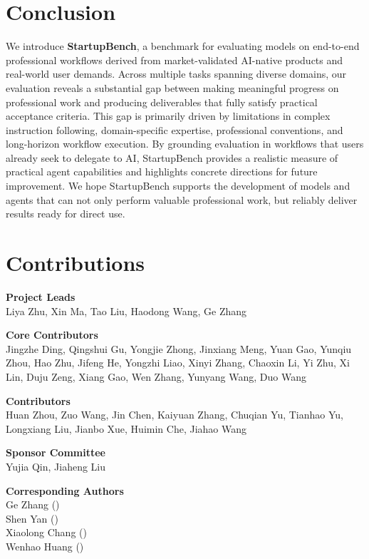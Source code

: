 \section{Conclusion}

We introduce \textbf{StartupBench}, a benchmark for evaluating models on end-to-end professional workflows derived from market-validated AI-native products and real-world user demands. Across multiple tasks spanning diverse domains, our evaluation reveals a substantial gap between making meaningful progress on professional work and producing deliverables that fully satisfy practical acceptance criteria. This gap is primarily driven by limitations in complex instruction following, domain-specific expertise, professional conventions, and long-horizon workflow execution. By grounding evaluation in workflows that users already seek to delegate to AI, StartupBench provides a realistic measure of practical agent capabilities and highlights concrete directions for future improvement. We hope StartupBench supports the development of models and agents that can not only perform valuable professional work, but reliably deliver results ready for direct use.




\clearpage
\section{Contributions}

\textbf{Project Leads} \\
Liya Zhu, Xin Ma, Tao Liu, Haodong Wang, Ge Zhang \\

\vspace{0.5em}

\textbf{Core Contributors} \\
Jingzhe Ding, Qingshui Gu, Yongjie Zhong, Jinxiang Meng, Yuan Gao,
Yunqiu Zhou, Hao Zhu, Jifeng He,
Yongzhi Liao, Xinyi Zhang, Chaoxin Li, Yi Zhu,
Xi Lin, Duju Zeng, Xiang Gao, Wen Zhang,
Yunyang Wang, Duo Wang \\

\vspace{0.5em}

\textbf{Contributors} \\
Huan Zhou, Zuo Wang, Jin Chen, Kaiyuan Zhang, Chuqian Yu, Tianhao Yu, Longxiang Liu, Jianbo Xue, Huimin Che, Jiahao Wang \\

\vspace{0.5em}

\textbf{Sponsor Committee} \\
Yujia Qin, Jiaheng Liu

\vspace{0.5em}

\textbf{Corresponding Authors} \\
Ge Zhang ()\\
Shen Yan  () \\
Xiaolong Chang ()\\
Wenhao Huang ()\\